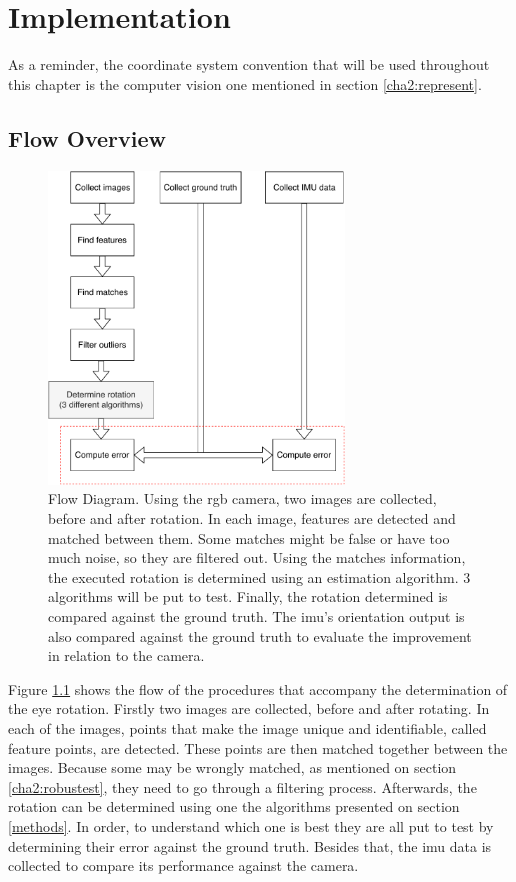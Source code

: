
\chapter{Implementation}
\label{implementation}

As a reminder, the coordinate system convention that will be used throughout this chapter is the computer vision one mentioned in section \ref{cha2:represent}. 

\section{Flow Overview}
\begin{figure}[ht]
	\centering
	\includegraphics[width=0.7\textwidth]{images/approach.pdf}
	\caption[Flow Diagram]{Flow Diagram. Using the \acrshort{rgb} camera, two images are collected, before and after rotation. In each image, features are detected and matched between them. Some matches might be false or have too much noise, so they are filtered out. Using the matches information, the executed rotation is determined using an estimation algorithm. 3 algorithms will be put to test. Finally, the rotation determined is compared against the ground truth. The \acrshort{imu}'s orientation output is also compared against the ground truth to evaluate the improvement in relation to the camera.}
	\label{cha3:methodology:approach}
\end{figure}
Figure \ref{cha3:methodology:approach} shows the flow of the procedures that accompany the determination of the eye rotation. Firstly two images are collected, before and after rotating. In each of the images, points that make the image unique and identifiable, called feature points, are detected. These points are then matched together between the images. Because some may be wrongly matched, as mentioned on section \ref{cha2:robustest}, they need to go through a filtering process. Afterwards, the rotation can be determined using one the algorithms presented on section \ref{methods}. In order, to understand which one is best they are all put to test by determining their error against the ground truth. Besides that, the \acrshort{imu} data is collected to compare its performance against the camera.\\

